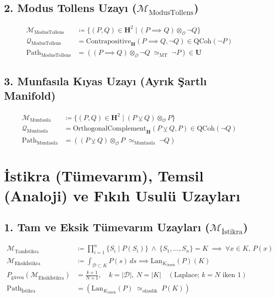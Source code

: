 \documentclass[11pt, a4paper]{article}
\begin{document}
\subsection{2. Modus Tollens Uzayı ($\mathcal{M}_{\text{ModusTollens}}$)}
\begin{align}
\mathcal{M}_{\text{ModusTollens}} &\coloneqq \{ (P, Q) \in \mathbf{H}^2 \mid (P \implies Q) \otimes_{\mathcal{O}} \neg Q \} \\
\mathcal{Q}_{\text{ModusTollens}} &= \text{Contrapositive}_{\mathbf{H}}(P \implies Q, \neg Q) \in \text{QCoh}(\neg P) \\
\text{Path}_{\text{ModusTollens}} &= ((P \implies Q) \otimes_{\mathcal{O}} \neg Q \;\simeq_{\text{MT}}\; \neg P) \in \mathbf{U}
\end{align}

\subsection{3. Munfasıla Kıyas Uzayı (Ayrık Şartlı Manifold)}
\begin{align}
\mathcal{M}_{\text{Munfasıla}} &\coloneqq \{ (P, Q) \in \mathbf{H}^2 \mid (P \veebar Q) \otimes_{\mathcal{O}} P \} \\
\mathcal{Q}_{\text{Munfasıla}} &= \text{OrthogonalComplement}_{\mathbf{H}}(P \veebar Q, P) \in \text{QCoh}(\neg Q) \\
\text{Path}_{\text{Munfasıla}} &= ((P \veebar Q) \otimes_{\mathcal{O}} P \;\simeq_{\text{Munfasıla}}\; \neg Q)
\end{align}

\section{İstikra (Tümevarım), Temsil (Analoji) ve Fıkıh Usulü Uzayları}

\subsection{1. Tam ve Eksik Tümevarım Uzayları ($\mathcal{M}_{\text{İstikra}}$)}
\begin{align}
\mathcal{M}_{\text{Tamİstikra}} &\coloneqq \textstyle\prod_{i=1}^n \{ S_i \mid P(S_i) \} \ \land \ \{S_1,\dots,S_n\} = K \ \implies \ \forall x \in K, \, P(x) \\
\mathcal{M}_{\text{Eksikİstikra}} &\coloneqq \int_{\mathcal{D} \subset K} P(s) \, ds \implies \text{Lan}_{K_{\text{örnek}}}(P)(K) \\
P_{\text{güven}}(\mathcal{M}_{\text{Eksikİstikra}}) &= \frac{k+1}{N+1}, \quad k = |\mathcal{D}|, \ N = |K| \quad (\text{Laplace; } k = N \text{ iken } 1) \\
\text{Path}_{\text{İstikra}} &= (\text{Lan}_{K_{\text{örnek}}}(P) \;\simeq_{\text{olasılık}}\; P(K))
\end{align}
\end{document}
